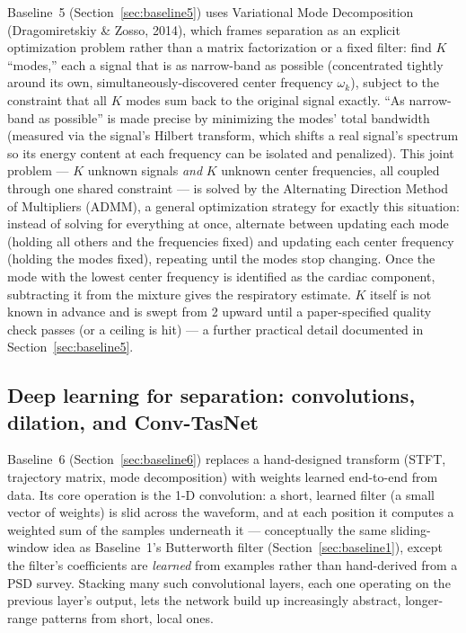 \documentclass[11pt]{article}
\begin{document}
Baseline~5 (Section~\ref{sec:baseline5}) uses Variational Mode
Decomposition (Dragomiretskiy \& Zosso, 2014), which frames separation as
an explicit optimization problem rather than a matrix factorization or a
fixed filter: find $K$ ``modes,'' each a signal that is as narrow-band as
possible (concentrated tightly around its own, simultaneously-discovered
center frequency $\omega_k$), subject to the constraint that all $K$ modes
sum back to the original signal exactly. ``As narrow-band as possible'' is
made precise by minimizing the modes' total bandwidth (measured via the
signal's Hilbert transform, which shifts a real signal's spectrum so its
energy content at each frequency can be isolated and penalized). This
joint problem --- $K$ unknown signals \emph{and} $K$ unknown center
frequencies, all coupled through one shared constraint --- is solved by
the Alternating Direction Method of Multipliers (ADMM), a general
optimization strategy for exactly this situation: instead of solving for
everything at once, alternate between updating each mode (holding all
others and the frequencies fixed) and updating each center frequency
(holding the modes fixed), repeating until the modes stop changing. Once
the mode with the lowest center frequency is identified as the cardiac
component, subtracting it from the mixture gives the respiratory estimate.
$K$ itself is not known in advance and is swept from 2 upward until a
paper-specified quality check passes (or a ceiling is hit) --- a further
practical detail documented in Section~\ref{sec:baseline5}.

\subsection{Deep learning for separation: convolutions, dilation, and Conv-TasNet}
\label{sec:bg-convtasnet}

Baseline~6 (Section~\ref{sec:baseline6}) replaces a hand-designed
transform (STFT, trajectory matrix, mode decomposition) with weights
learned end-to-end from data. Its core operation is the 1-D convolution: a
short, learned filter (a small vector of weights) is slid across the
waveform, and at each position it computes a weighted sum of the samples
underneath it --- conceptually the same sliding-window idea as
Baseline~1's Butterworth filter (Section~\ref{sec:baseline1}), except the
filter's coefficients are \emph{learned} from examples rather than
hand-derived from a PSD survey. Stacking many such convolutional layers,
each one operating on the previous layer's output, lets the network build
up increasingly abstract, longer-range patterns from short, local ones.
\end{document}
